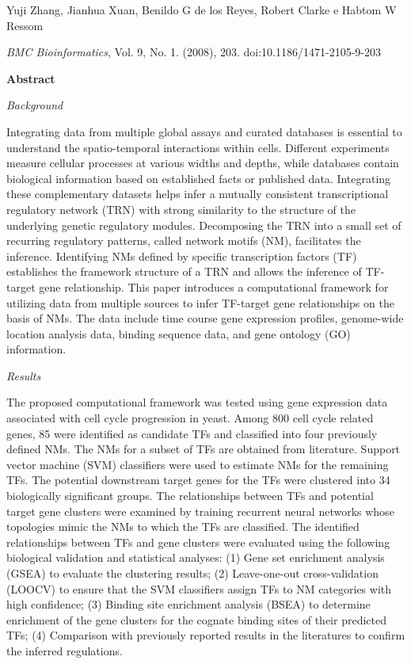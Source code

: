 Yuji Zhang, Jianhua Xuan, Benildo G de los Reyes, Robert Clarke e  Habtom W Ressom

{\it BMC Bioinformatics}, Vol. 9, No. 1. (2008), 203. doi:10.1186/1471-2105-9-203 

{\large \bf Abstract}

{\it Background}

Integrating data from multiple global assays and curated databases is essential to understand the spatio-temporal interactions within cells. Different experiments measure cellular processes at various widths and depths, while databases contain biological information based on established facts or published data. Integrating these complementary datasets helps infer a mutually consistent transcriptional regulatory network (TRN) with strong similarity to the structure of the underlying genetic regulatory modules. Decomposing the TRN into a small set of recurring regulatory patterns, called network motifs (NM), facilitates the inference. Identifying NMs defined by specific transcription factors (TF) establishes the framework structure of a TRN and allows the inference of TF-target gene relationship. This paper introduces a computational framework for utilizing data from multiple sources to infer TF-target gene relationships on the basis of NMs. The data include time course gene expression profiles, genome-wide location analysis data, binding sequence data, and gene ontology (GO) information.

{\it Results}

The proposed computational framework was tested using gene expression data associated with cell cycle progression in yeast. Among 800 cell cycle related genes, 85 were identified as candidate TFs and classified into four previously defined NMs. The NMs for a subset of TFs are obtained from literature. Support vector machine (SVM) classifiers were used to estimate NMs for the remaining TFs. The potential downstream target genes for the TFs were clustered into 34 biologically significant groups. The relationships between TFs and potential target gene clusters were examined by training recurrent neural networks whose topologies mimic the NMs to which the TFs are classified. The identified relationships between TFs and gene clusters were evaluated using the following biological validation and statistical analyses: (1) Gene set enrichment analysis (GSEA) to evaluate the clustering results; (2) Leave-one-out cross-validation (LOOCV) to ensure that the SVM classifiers assign TFs to NM categories with high confidence; (3) Binding site enrichment analysis (BSEA) to determine enrichment of the gene clusters for the cognate binding sites of their predicted TFs; (4) Comparison with previously reported results in the literatures to confirm the inferred regulations.

